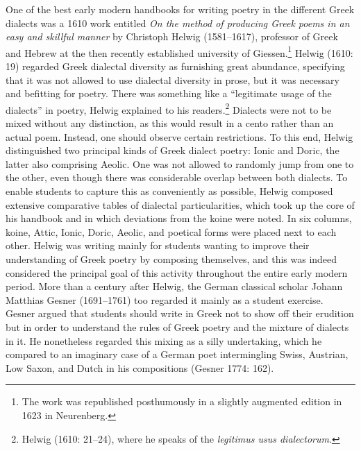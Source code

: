 \begin{styleStandard}
One of the best early modern handbooks for writing poetry in the different Greek dialects was a 1610 work entitled \textit{On the method of producing Greek poems in an easy and skillful manner} by Christoph Helwig (1581–1617), professor of Greek and Hebrew at the then recently established university of Giessen.\footnote{ The work was republished posthumously in a slightly augmented edition in 1623 in Neurenberg.} Helwig (1610: 19) regarded Greek dialectal diversity as furnishing great abundance, specifying that it was not allowed to use dialectal diversity in prose, but it was necessary and befitting for poetry. There was something like a “legitimate usage of the dialects” in poetry, Helwig explained to his readers.\footnote{ Helwig (1610: 21–24), where he speaks of the \textit{legitimus usus dialectorum}.} Dialects were not to be mixed without any distinction, as this would result in a cento rather than an actual poem. Instead, one should observe certain restrictions. To this end, Helwig distinguished two principal kinds of Greek dialect poetry: Ionic and Doric, the latter also comprising Aeolic. One was not allowed to randomly jump from one to the other, even though there was considerable overlap between both dialects. To enable students to capture this as conveniently as possible, Helwig composed extensive comparative tables of dialectal particularities, which took up the core of his handbook and in which deviations from the koine were noted. In six columns, koine, Attic, Ionic, Doric, Aeolic, and poetical forms were placed next to each other. Helwig was writing mainly for students wanting to improve their understanding of Greek poetry by composing themselves, and this was indeed considered the principal goal of this activity throughout the entire early modern period. More than a century after Helwig, the German classical scholar Johann Matthias Gesner (1691–1761) too regarded it mainly as a student exercise. Gesner argued that students should write in Greek not to show off their erudition but in order to understand the rules of Greek poetry and the mixture of dialects in it. He nonetheless regarded this mixing as a silly undertaking, which he compared to an imaginary case of a German poet intermingling Swiss, Austrian, Low Saxon, and Dutch in his compositions (Gesner 1774: 162).
\end{styleStandard}

